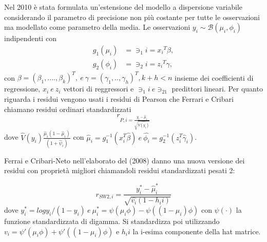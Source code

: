 \documentclass[twoside,twocolumn]{article}
\begin{document}
Nel 2010 è stata formulata un'estensione del modello a dispersione variabile considerando il parametro di precisione non più costante per tutte le osservazioni ma modellato come parametro della media. Le osservazioni $y_i \sim \mathbb{\mathcal{B}}(\mu_i, \phi_i)$ indipendenti con 
\begin{align*}
g_1(\mu_i)&=\ni_1i=x{_i}^T \beta,\\
g_2(\phi_i)&=\ni_2i=z{_i}^T \gamma,
\end{align*}
con $\beta=(\beta_1,....,\beta_k)^T , \  e \ \gamma=(\gamma_1,..,\gamma_h)^T , k+h<n$ insieme dei coefficienti di regressione, $x_i \ e \ z_i$ vettori di reggressori e $\ni_1i \ e \ni_21 $ predittori lineari. Per quanto riguarda i residui vengono usati i residui di Pearson che Ferrari e Cribari chiamano residui ordinari standardizzati
$$r_{P,i=\frac{y_i-\hat{\mu}_i}{\sqrt{\hat{V(y_i)}}}}$$  dove $\hat{V}(y_i)\frac{\hat{\mu}_i(1-\hat{\mu}_i)}{(1+\hat{\psi}_i)}$ con $\hat{\mu}_i=g_1 ^{-1}(x_i ^T \hat{\beta}) \ e \ \hat{\phi_i}=g_2^{-1}(z_i ^T \hat{\gamma}_i)$.

Ferrai e Cribari-Neto nell'elaborato del (2008) danno una nuova versione dei residui con proprietà migliori chiamandoli residui standardizzati pesati 2:

$$r_{SW2,i}=\frac{y_i ^* - \hat{\mu}_i ^*}{\sqrt{\hat{v_i}(1-h_ii)}}$$
dove $y_i ^* = log{y_i/(1-y_i)} \ e \ \mu _i ^* = \psi (\mu_i \phi)-\psi ((1-\mu_i)\phi)$ con $\psi (\cdot)$ la funzione standardizzata di digamma. Si standardizza poi utilizzando $v_i= {\psi ' (\mu_i\phi)+\psi '((1-\mu_i)\phi)}$ e $h_ii$ la i-esima componente della hat matrice.\cite{RESIDUAL}
\end{document}
